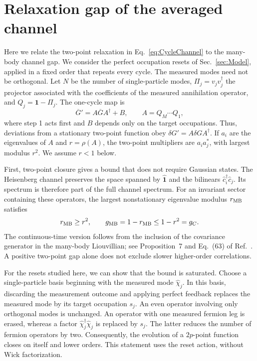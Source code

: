 \documentclass[aps,prb,10pt,twocolumn,superscriptaddress,longbibliography,floatfix]{revtex4-2}
\begin{document}
{\color{blue}
\section{Relaxation gap of the averaged channel}
\label{app:ChannelGap}

Here we relate the two-point relaxation in Eq.~\eqref{eq:CycleChannel} to the many-body channel gap. We consider the perfect occupation resets of Sec.~\ref{sec:Model}, applied in a fixed order that repeats every cycle. The measured modes need not be orthogonal. Let $N$ be the number of single-particle modes, $\Pi_j=v_jv_j^\dagger$ the projector associated with the coefficients of the measured annihilation operator, and $Q_j=\mathbf{1}-\Pi_j$. The one-cycle map is
\begin{equation}
    \overline G'=A\overline GA^\dagger+B,
    \qquad A=Q_M\cdots Q_1,
    \label{eq:AppCycleChannel}
\end{equation}
where step 1 acts first and $B$ depends only on the target occupations. Thus, deviations from a stationary two-point function obey $\delta G'=A\delta GA^\dagger$. If $a_i$ are the eigenvalues of $A$ and $r=\rho(A)$, the two-point multipliers are $a_i a_j^*$, with largest modulus $r^2$. We assume $r<1$ below.

First, two-point closure gives a bound that does not require Gaussian states. The Heisenberg channel preserves the space spanned by $\hat{\mathbf{1}}$ and the bilinears $\hat c_i^\dagger\hat c_j$. Its spectrum is therefore part of the full channel spectrum. For an invariant sector containing these operators, the largest nonstationary eigenvalue modulus $r_{\rm MB}$ satisfies
\begin{equation}
    r_{\rm MB}\geq r^2,
    \qquad g_{\rm MB}=1-r_{\rm MB}\leq 1-r^2=g_C.
    \label{eq:ChannelGapBound}
\end{equation}
The continuous-time version follows from the inclusion of the covariance generator in the many-body Liouvillian; see Proposition~7 and Eq.~(63) of Ref.~\cite{BarthelZhang2022}. A positive two-point gap alone does not exclude slower higher-order correlations.

For the resets studied here, we can show that the bound is saturated. Choose a single-particle basis beginning with the measured mode $\hat\chi_j$. In this basis, discarding the measurement outcome and applying perfect feedback replaces the measured mode by its target occupation $s_j$. An even operator involving only orthogonal modes is unchanged. An operator with one measured fermion leg is erased, whereas a factor $\hat\chi_j^\dagger\hat\chi_j$ is replaced by $s_j$. The latter reduces the number of fermion operators by two. Consequently, the evolution of a $2p$-point function closes on itself and lower orders. This statement uses the reset action, without Wick factorization.

}
\end{document}
